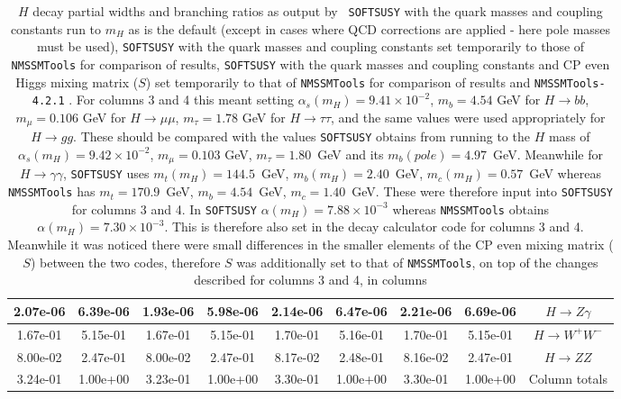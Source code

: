 \documentclass[final,3p,times]{elsarticle}
\begin{document}
\begin{center}
\begin{table}
\begin{tabular}{|c|c|c|c|c|c|c|c|c|}
2.07e-06 & 6.39e-06 & 1.93e-06 & 5.98e-06 & 2.14e-06 & 6.47e-06 & 2.21e-06 & 6.69e-06 & $H \rightarrow Z \gamma$ \\ \hline
1.67e-01 & 5.15e-01 & 1.67e-01 & 5.15e-01 & 1.70e-01 & 5.16e-01 & 1.70e-01 & 5.15e-01 & $H \rightarrow W^+ W^-$ \\ \hline
8.00e-02 & 2.47e-01 & 8.00e-02 & 2.47e-01 & 8.17e-02 & 2.48e-01 & 8.16e-02 & 2.47e-01 & $H \rightarrow Z Z$ \\ \hline
3.24e-01 & 1.00e+00 & 3.23e-01 & 1.00e+00 & 3.30e-01 & 1.00e+00 & 3.30e-01 & 1.00e+00 & Column totals \\ \hline
\end{tabular}
\caption{$H$ decay partial widths and branching ratios as output by {\tt
    SOFTSUSY} with the quark masses and coupling constants run to $m_{H}$
  as is the default (except in cases where QCD corrections are applied - here pole masses
  must be used), {\tt SOFTSUSY} with the quark masses and coupling
  constants set temporarily to those of {\tt NMSSMTools} for comparison of
  results, {\tt SOFTSUSY} with the quark masses and coupling
  constants and CP even Higgs mixing matrix ($S$) set temporarily to that
  of {\tt NMSSMTools} for comparison of
  results and {\tt NMSSMTools-4.2.1}
  \cite{Ellwanger:2004xm,Ellwanger:2012dd,Ellwanger:2006ch}. For columns 3 and
  4 this  
  meant setting $\alpha_s(m_{H})= 9.41\times10^{-2}$, $m_b = 4.54$ GeV for
  $H  
  \rightarrow 
  bb$, $m_{\mu}= 0.106$ GeV for $H \rightarrow \mu \mu$, $m_{\tau}=
  1.78$ GeV for $H 
  \rightarrow  
  \tau \tau$, and the same values were used appropriately for $H 
  \rightarrow gg$. These should be compared with the values {\tt SOFTSUSY}
  obtains from 
  running to the $H$ mass of $\alpha_s(m_{H}) = 9.42\times 10^{-2}$,
  $m_{\mu} = 0.103$ GeV, $m_{\tau} = 1.80$~GeV and its $m_b(pole) = 4.97$~GeV. Meanwhile for $H \rightarrow \gamma \gamma$, {\tt SOFTSUSY}
  uses $m_t(m_{H}) = 144.5$~GeV, $m_{b}(m_{H}) = 2.40$~GeV, $m_c(m_{H}) =
  0.57$~GeV whereas {\tt NMSSMTools}
  has $m_t = 170.9$~GeV, $m_b = 4.54$~GeV, $m_c = 1.40$~GeV. These were
  therefore input into {\tt SOFTSUSY}  
  for columns 3 and 4. In {\tt SOFTSUSY} 
  $\alpha(m_{H}) = 7.88\times10^{-3}$ whereas {\tt NMSSMTools} obtains
  $\alpha(m_{H}) = 7.30\times10^{-3}$. This 
  is therefore also set in the decay calculator code for columns 3 and 4. Meanwhile it was noticed there were small
  differences in the smaller elements of the CP even mixing matrix ($S$) between the two codes, therefore $S$ 
  was additionally set to that of {\tt NMSSMTools}, on top of the changes described for columns 3 and 4, in columns
}
\end{table}
\end{center}
\end{document}
